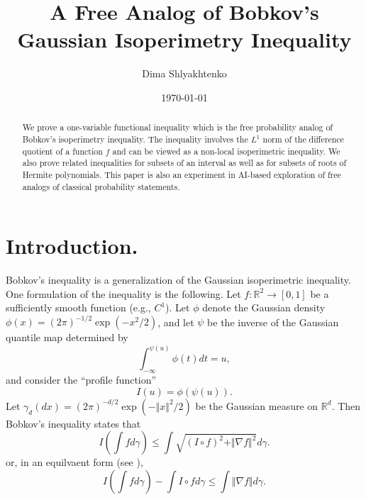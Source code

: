 \usepackage{graphicx,mathrsfs} %

\newtheorem{theorem}{Theorem}
\newtheorem{lemma}{Lemma}

\newtheorem{corollary}{Corollary}
\title{A Free Analog of Bobkov's Gaussian Isoperimetry Inequality}
\author{Dima Shlyakhtenko}
\date{\today}



\maketitle

\begin{abstract}
    We prove a one-variable functional inequality which is the free probability analog of Bobkov's isoperimetry inequality. The inequality involves the $L^1$ norm of the difference quotient of a function $f$ and can be viewed as a non-local isoperimetric inequality. We also prove related inequalities for subsets of an interval as well as for subsets of roots of Hermite polynomials. This paper is also an experiment in AI-based exploration of free analogs of classical probability statements.
\end{abstract}


\section{Introduction.} \label{sec:notation}  Bobkov's inequality \cite{Bobkov1997} is a generalization of the Gaussian isoperimetric inequality. One formulation of the inequality is the following. Let $f:\mathbb{R}^2\to[0,1]$ be a sufficiently smooth function (e.g., $C^1$).  Let $\phi$ denote the Gaussian density $\phi(x)=(2\pi)^{-1/2} \exp(-x^2/2)$, and let $\psi$ be the inverse of the Gaussian quantile map determined by $$
\int_{-\infty}^{\psi(u)} \phi(t)dt = u,
$$  and consider the ``profile function'' $$I(u) = \phi(\psi(u)).$$  Let $\gamma_d (dx) = (2\pi)^{-d/2} \exp(-\Vert x\Vert^2/2)$ be the Gaussian measure on $\mathbb{R}^d$.  Then Bobkov's inequality states that
\begin{equation}\label{eq:strongBobkov}
I\left(\int fd\gamma\right)  \leq \int \sqrt{ (I\circ f)^2 + \Vert \nabla f\Vert^2} d\gamma.
\end{equation}
or, in an equilvaent form (see \cite{BartheMaurey}),
\begin{equation}\label{eq:weakBobkov}
I\left(\int fd\gamma\right) - \int I\circ f d\gamma \leq \int \Vert \nabla f\Vert d\gamma.
\end{equation}

